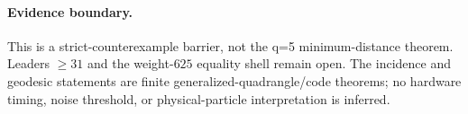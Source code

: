 \paragraph{Evidence boundary.}
This is a strict-counterexample barrier, not the q=5 minimum-distance theorem.  Leaders $\ge31$ and the weight-$625$ equality shell remain open.  The incidence and geodesic statements are finite generalized-quadrangle/code theorems; no hardware timing, noise threshold, or physical-particle interpretation is inferred.
\fi
